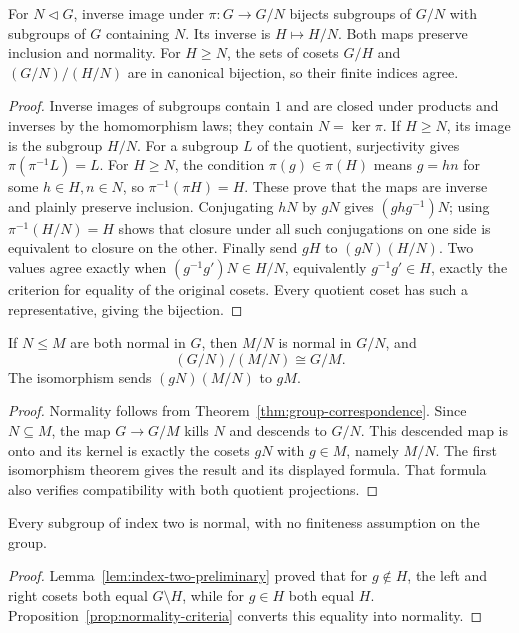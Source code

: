 \begin{theorem}\label{thm:group-correspondence}
For $N\mathrel{\triangleleft}G$, inverse image under $\pi:G\to G/N$ bijects subgroups of $G/N$ with subgroups of $G$ containing $N$. Its inverse is $H\mapsto H/N$. Both maps preserve inclusion and normality. For $H\geq N$, the sets of cosets $G/H$ and $(G/N)/(H/N)$ are in canonical bijection, so their finite indices agree.
\end{theorem}
\begin{proof}
Inverse images of subgroups contain $1$ and are closed under products and inverses by the homomorphism laws; they contain $N=\ker\pi$. If $H\geq N$, its image is the subgroup $H/N$. For a subgroup $L$ of the quotient, surjectivity gives $\pi(\pi^{-1}L)=L$. For $H\geq N$, the condition $\pi(g)\in\pi(H)$ means $g=hn$ for some $h\in H,n\in N$, so $\pi^{-1}(\pi H)=H$. These prove that the maps are inverse and plainly preserve inclusion. Conjugating $hN$ by $gN$ gives $(ghg^{-1})N$; using $\pi^{-1}(H/N)=H$ shows that closure under all such conjugations on one side is equivalent to closure on the other. Finally send $gH$ to $(gN)(H/N)$. Two values agree exactly when $(g^{-1}g')N\in H/N$, equivalently $g^{-1}g'\in H$, exactly the criterion for equality of the original cosets. Every quotient coset has such a representative, giving the bijection.
\end{proof}

\begin{theorem}\label{thm:group-third-isomorphism}
If $N\leq M$ are both normal in $G$, then $M/N$ is normal in $G/N$, and
\[
 (G/N)/(M/N)\cong G/M.
\]
The isomorphism sends $(gN)(M/N)$ to $gM$.
\end{theorem}
\begin{proof}
Normality follows from Theorem~\ref{thm:group-correspondence}. Since $N\subseteq M$, the map $G\to G/M$ kills $N$ and descends to $G/N$. This descended map is onto and its kernel is exactly the cosets $gN$ with $g\in M$, namely $M/N$. The first isomorphism theorem gives the result and its displayed formula. That formula also verifies compatibility with both quotient projections.
\end{proof}

\begin{corollary}\label{cor:index-two-normal}
Every subgroup of index two is normal, with no finiteness assumption on the group.
\end{corollary}
\begin{proof}
Lemma~\ref{lem:index-two-preliminary} proved that for $g\notin H$, the left and right cosets both equal $G\setminus H$, while for $g\in H$ both equal $H$. Proposition~\ref{prop:normality-criteria} converts this equality into normality.
\end{proof}

